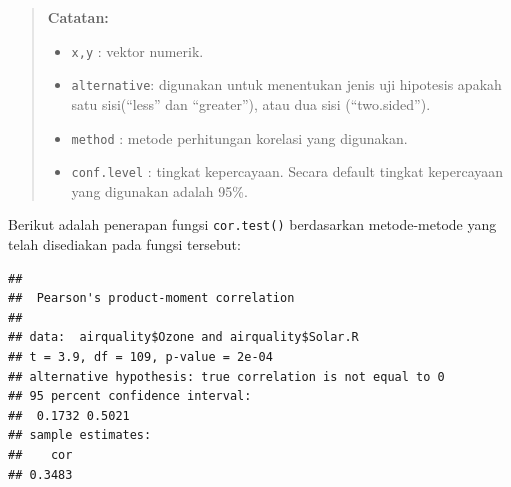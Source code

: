 \documentclass[
]{book}
\newenvironment{Shaded}{\begin{snugshade}}{\end{snugshade}}
\newcommand{\AttributeTok}[1]{\textcolor[rgb]{0.13,0.29,0.53}{#1}}
\newcommand{\CommentTok}[1]{\textcolor[rgb]{0.56,0.35,0.01}{\textit{#1}}}
\newcommand{\FunctionTok}[1]{\textcolor[rgb]{0.13,0.29,0.53}{\textbf{#1}}}
\newcommand{\NormalTok}[1]{#1}
\newcommand{\SpecialCharTok}[1]{\textcolor[rgb]{0.81,0.36,0.00}{\textbf{#1}}}
\newcommand{\StringTok}[1]{\textcolor[rgb]{0.31,0.60,0.02}{#1}}
\providecommand{\tightlist}{%
  \setlength{\itemsep}{0pt}\setlength{\parskip}{0pt}}
\theoremstyle{definition}
\theoremstyle{definition}
\theoremstyle{definition}
\theoremstyle{definition}
\theoremstyle{remark}
\begin{document}
\begin{quote}
\textbf{Catatan:}

\begin{itemize}
\tightlist
\item
  \texttt{x,y} : vektor numerik.
\item
  \texttt{alternative}: digunakan untuk menentukan jenis uji hipotesis apakah satu sisi(``less'' dan ``greater''), atau dua sisi (``two.sided'').
\item
  \texttt{method} : metode perhitungan korelasi yang digunakan.
\item
  \texttt{conf.level} : tingkat kepercayaan. Secara default tingkat kepercayaan yang digunakan adalah 95\%.
\end{itemize}
\end{quote}

Berikut adalah penerapan fungsi \texttt{cor.test()} berdasarkan metode-metode yang telah disediakan pada fungsi tersebut:

\begin{Shaded}
\end{Shaded}

\begin{verbatim}
## 
##  Pearson's product-moment correlation
## 
## data:  airquality$Ozone and airquality$Solar.R
## t = 3.9, df = 109, p-value = 2e-04
## alternative hypothesis: true correlation is not equal to 0
## 95 percent confidence interval:
##  0.1732 0.5021
## sample estimates:
##    cor 
## 0.3483
\end{verbatim}

\begin{Shaded}
\end{Shaded}
\end{document}
